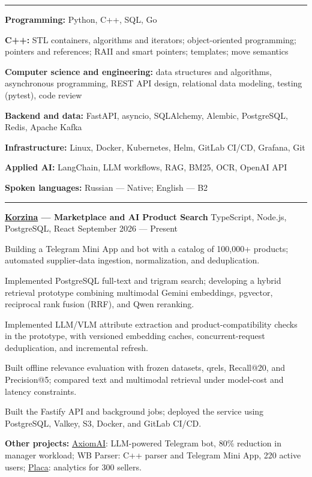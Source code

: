 \documentclass[10pt,a4paper]{article}
\newcommand{\cvsection}[1]{%
  \vspace{5pt}{\large\bfseries #1}\par\vspace{2pt}\hrule\vspace{3pt}}
\newcommand{\cventry}[3]{%
  \textbf{#1} \textbar{} #3 \textbar{} #2\par\vspace{1pt}}
\begin{document}
\cvsection{Technical Skills}
\textbf{Programming:} Python, C++, SQL, Go\par
\textbf{C++:} STL containers, algorithms and iterators; object-oriented programming; pointers and references; RAII and smart pointers; templates; move semantics\par
\textbf{Computer science and engineering:} data structures and algorithms, asynchronous programming, REST API design, relational data modeling, testing (pytest), code review\par
\textbf{Backend and data:} FastAPI, asyncio, SQLAlchemy, Alembic, PostgreSQL, Redis, Apache Kafka\par
\textbf{Infrastructure:} Linux, Docker, Kubernetes, Helm, GitLab CI/CD, Grafana, Git\par
\textbf{Applied AI:} LangChain, LLM workflows, RAG, BM25, OCR, OpenAI API\par
\textbf{Spoken languages:} Russian --- Native; English --- B2

\cvsection{Projects}
\cventry{\href{https://github.com/noobmaster-ru/korzina-market}{Korzina} --- Marketplace and AI Product Search}{September 2026 --- Present}{TypeScript, Node.js, PostgreSQL, React}
\begin{cvitems}
    \item Building a Telegram Mini App and bot with a catalog of 100,000+ products; automated supplier-data ingestion, normalization, and deduplication.
    \item Implemented PostgreSQL full-text and trigram search; developing a hybrid retrieval prototype combining multimodal Gemini embeddings, pgvector, reciprocal rank fusion (RRF), and Qwen reranking.
    \item Implemented LLM/VLM attribute extraction and product-compatibility checks in the prototype, with versioned embedding caches, concurrent-request deduplication, and incremental refresh.
    \item Built offline relevance evaluation with frozen datasets, qrels, Recall@20, and Precision@5; compared text and multimodal retrieval under model-cost and latency constraints.
    \item Built the Fastify API and background jobs; deployed the service using PostgreSQL, Valkey, S3, Docker, and GitLab CI/CD.
\end{cvitems}
\textbf{Other projects:} \href{https://github.com/noobmaster-ru/axiomai}{AxiomAI}: LLM-powered Telegram bot, 80\% reduction in manager workload; WB Parser: C++ parser and Telegram Mini App, 220 active users; \href{https://github.com/noobmaster-ru/wb_tables}{Placa}: analytics for 300 sellers.\par
\end{document}

